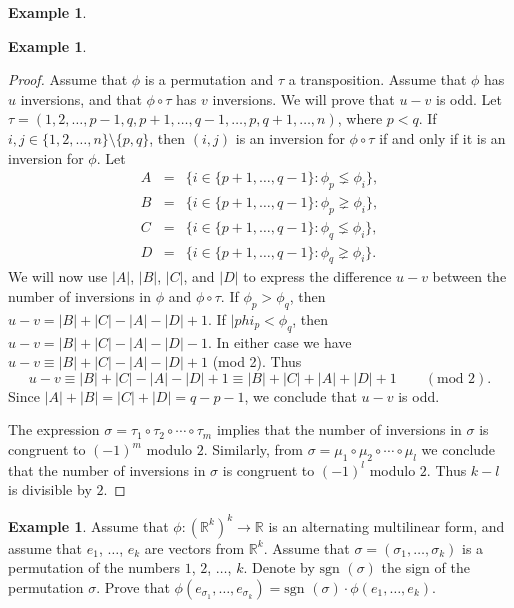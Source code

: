 \documentclass[11pt]{article}
\theoremstyle{definition}
\newtheorem{exmp}[thm]{Example}
\theoremstyle{plain}
\begin{document}
\begin{exmp}
\begin{exmp}
\begin{proof}
Assume that \( \phi \) is a permutation and \( \tau \) a transposition. Assume that \( \phi \) has \( u \) inversions, and that \( \phi\circ \tau \) has \( v \) inversions. We will prove that \( u-v \) is odd. Let \( \tau=(1,2,\dots,p-1, q,p+1, \dots, q-1,\dots, p, q+1,\dots, n) \), where \( p< q \). If \( i,j\in\{1,2,\dots, n\}\setminus\{p,q\} \), then \( (i,j) \) is an inversion for \( \phi\circ \tau \) if and only if it is an inversion for \( \phi \). Let \begin{eqnarray*}A&=&\{i\in\{p+1,\dots, q-1\}: \phi_p\lneq \phi_i\},\\ B&=&\{i\in\{p+1,\dots, q-1\}: \phi_p\gneq \phi_i\},\\ C&=&\{i\in\{p+1,\dots, q-1\}: \phi_q\lneq \phi_i\}, \\D&=&\{i\in\{p+1,\dots, q-1\}: \phi_q\gneq \phi_i\}. \end{eqnarray*} We will now use \( |A| \), \( |B| \), \( |C| \), and \( |D| \) to express the difference \( u-v \) between the number of inversions in \( \phi \) and \( \phi\circ \tau \). If \( \phi_p> \phi_q \), then \( u-v=|B|+|C|-|A|-|D|+1 \). If \( |phi_p< \phi_q \), then \( u-v=|B|+|C|-|A|-|D|-1 \). In either case we have \( u-v\equiv |B|+|C|-|A|-|D|+1 \) (mod 2). Thus \[ u-v\equiv |B|+|C|-|A|-|D|+1\equiv |B|+|C|+|A|+|D|+1\quad\quad (\mbox{mod }2).\] Since \( |A|+|B|=|C|+|D|=q-p-1 \), we conclude that \( u-v \) is odd.

The expression \( \sigma=\tau_1\circ \tau_2\circ \cdots \circ\tau_m \) implies that the number of inversions in \( \sigma \) is congruent to \( (-1)^m \) modulo \( 2 \). Similarly, from \( \sigma=\mu_1\circ \mu_2\circ\cdots\circ \mu_l \) we conclude that the number of inversions in \( \sigma \) is congruent to \( (-1)^l \) modulo \( 2 \). Thus \( k-l \) is divisible by \( 2 \).
\end{proof}

\begin{exmp}
Assume that \( \phi:\left(\mathbb R^k\right)^k\to \mathbb R \) is an alternating multilinear form, and assume that \( e_1 \), \( \dots \), \( e_k \) are vectors from \( \mathbb R^k \). Assume that \( \sigma=(\sigma_1, \dots, \sigma_k) \) is a permutation of the numbers \( 1 \), \( 2 \), \( \dots \), \( k \). Denote by \( \mbox{sgn }(\sigma) \) the sign of the permutation \( \sigma \). Prove that \( \phi(e_{\sigma_1},\dots, e_{\sigma_k})=\mbox{sgn }(\sigma)\cdot \phi(e_1,\dots, e_k) \).
\end{exmp}


\end{exmp}
\end{exmp}
\end{document}
